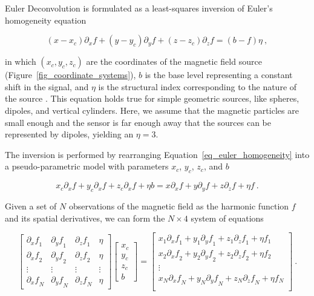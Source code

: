 Euler Deconvolution is formulated as a least-squares inversion of Euler's
homogeneity equation

\begin{equation}
\label{eq_euler_homogeneity}
(x - x_c)\partial_x f
+ (y - y_c)\partial_y f
+ (z - z_c)\partial_z f
= (b - f)\eta
\ ,
\end{equation}

\noindent
in which $(x_c, y_c, z_c)$ are the coordinates of the magnetic field source (Figure~\ref{fig_coordinate_systems}), $b$ is the base level representing a constant shift in the signal, and $\eta$ is the structural index corresponding to the nature of the source \citep{Reid1990}. This equation holds true for simple geometric sources, like spheres, dipoles, and vertical cylinders. Here, we assume that the magnetic particles are small enough and the sensor is far enough away that the sources can be represented by dipoles, yielding an $\eta=3$.

The inversion is performed by rearranging Equation~\ref{eq_euler_homogeneity} into a pseudo-parametric model with parameters $x_c$, $y_c$, $z_c$, and $b$

\begin{equation}
x_c \partial_x f + y_c \partial_x f + z_c \partial_x f + \eta b
=
x \partial_x f + y \partial_y f + z \partial_z f + \eta f
\ .
\end{equation}

Given a set of $N$ observations of the magnetic field as the harmonic function $f$ and its spatial derivatives, we can form the $N \times 4$ system of equations

\begin{equation}
\begin{bmatrix}
  {\partial_x f}_1 & {\partial_y f}_1 & {\partial_z f}_1 & \eta \\
  {\partial_x f}_2 & {\partial_y f}_2 & {\partial_z f}_2 & \eta \\
  \vdots & \vdots & \vdots & \vdots \\
  {\partial_x f}_N & {\partial_y f}_N & {\partial_z f}_N & \eta
\end{bmatrix}
\begin{bmatrix}
  x_c \\ y_c \\ z_c \\ b
\end{bmatrix}
=
\begin{bmatrix}
  x_1 {\partial_x f}_1 + y_1 {\partial_y f}_1 + z_1 {\partial_z f}_1 + \eta f_1 \\
  x_2 {\partial_x f}_2 + y_2 {\partial_y f}_2 + z_2 {\partial_z f}_2 + \eta f_2 \\
  \vdots \\
  x_N {\partial_x f}_N + y_N {\partial_y f}_N + z_N {\partial_z f}_N + \eta f_N \\
\end{bmatrix}
\ .
\end{equation}


